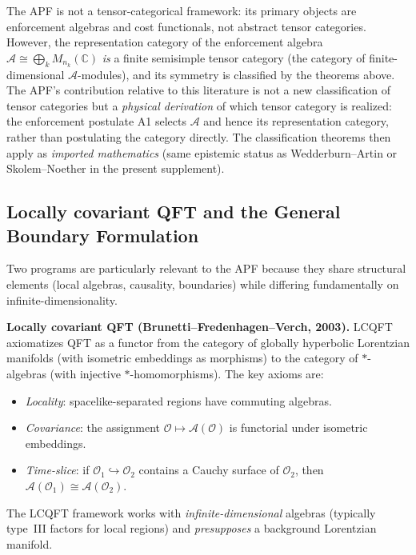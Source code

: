 \documentclass[11pt,a4paper]{article}
\theoremstyle{definition}
\begin{document}
The APF is not a tensor-categorical framework: its primary objects are
enforcement algebras and cost functionals, not abstract tensor
categories.  However, the representation category of the enforcement
algebra $\mathcal{A} \cong \bigoplus_k M_{n_k}(\mathbb{C})$
\emph{is} a finite semisimple tensor category (the category of
finite-dimensional $\mathcal{A}$-modules), and its symmetry is
classified by the theorems above.  The APF's contribution relative to
this literature is not a new classification of tensor categories but a
\emph{physical derivation} of which tensor category is realized: the
enforcement postulate A1 selects $\mathcal{A}$ and hence its
representation category, rather than postulating the category
directly.  The classification theorems then apply as \emph{imported
mathematics} (same epistemic status as Wedderburn--Artin or
Skolem--Noether in the present supplement).


\subsection{Locally covariant QFT and the General Boundary Formulation}
\label{sec:lcqft_oeckl}

Two programs are particularly relevant to the APF because they
share structural elements (local algebras, causality, boundaries)
while differing fundamentally on infinite-dimensionality.

\smallskip\noindent\textbf{Locally covariant QFT
(Brunetti--Fredenhagen--Verch, 2003).}\quad
LCQFT axiomatizes QFT as a functor from the category of globally
hyperbolic Lorentzian manifolds (with isometric embeddings as morphisms)
to the category of $*$-algebras (with injective $*$-homomorphisms).
The key axioms are:
\begin{itemize}[nosep]
  \item \textit{Locality}: spacelike-separated regions have commuting
  algebras.
  \item \textit{Covariance}: the assignment $\mathcal{O} \mapsto
  \mathcal{A}(\mathcal{O})$ is functorial under isometric embeddings.
  \item \textit{Time-slice}: if $\mathcal{O}_1 \hookrightarrow
  \mathcal{O}_2$ contains a Cauchy surface of $\mathcal{O}_2$, then
  $\mathcal{A}(\mathcal{O}_1) \cong \mathcal{A}(\mathcal{O}_2)$.
\end{itemize}
The LCQFT framework works with \emph{infinite-dimensional} algebras
(typically type~III factors for local regions) and
\emph{presupposes} a background Lorentzian manifold.
\end{document}
